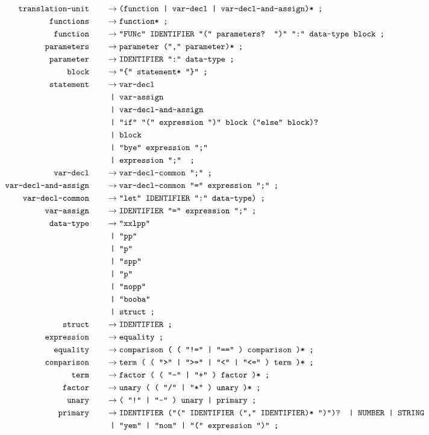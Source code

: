 \documentclass[12pt, a4paper]{article}
\newcommand{\ttt}[1]{
    \text{\texttt{#1}}
}
\newcommand{\ebnfnode}[2]{%
    #1\hspace{20px} &\to #2\ttt{ ;}\\
}
\newcommand{\ebnfnodett}[2]{%
    \ebnfnode{\ttt{#1}}{\ttt{#2}}
}
\begin{document}
    \begin{align*}
        \ebnfnodett{translation-unit}{(function | var-decl | var-decl-and-assign)*}
        \ebnfnodett{functions}{function*}
        \ebnfnodett{function}{"FUNc" IDENTIFIER "(" parameters? ")" ":" data-type block}
        \ebnfnodett{parameters}{parameter ("," parameter)*}
        \ebnfnodett{parameter}{IDENTIFIER ":" data-type}
        \ebnfnodett{block}{"\{" statement* "\}"}
        \ebnfnode{\ttt{statement}}
        {%
            \ttt{var-decl}\\
            &\ttt{ | var-assign }\\
            &\ttt{ | var-decl-and-assign }\\
            &\ttt{ | "if" "(" expression ")" block ("else" block)?}\\
            &\ttt{ | block }\\
            &\ttt{ | "bye" expression ";" }\\
            &\ttt{ | expression ";" }
        }
        \ebnfnodett{var-decl}{var-decl-common ";"}
        \ebnfnodett{var-decl-and-assign}{var-decl-common "=" expression ";"}
        \ebnfnodett{var-decl-common}{"let" IDENTIFIER ":" data-type)}
        \ebnfnodett{var-assign}{IDENTIFIER "=" expression ";"}
        \ebnfnode{\ttt{data-type}}
        {%
            \ttt{"xxlpp"}\\
            &\ttt{ | "pp"}\\
            &\ttt{ | "p"}\\
            &\ttt{ | "spp"}\\
            &\ttt{ | "p"}\\
            &\ttt{ | "nopp"}\\
            &\ttt{ | "booba"}\\
            &\ttt{ | struct}
        }
        \ebnfnodett{struct}{IDENTIFIER}
        \ebnfnodett{expression}{equality}
        \ebnfnodett{equality}{comparison ( ( "!=" | "==" ) comparison )*}
        \ebnfnodett{comparison}{term ( ( ">" | ">=" | "<" | "<=" ) term )*}
        \ebnfnodett{term}{factor ( ( "-" | "+" ) factor )*}
        \ebnfnodett{factor}{unary ( ( "/" | "*" ) unary )*}
        \ebnfnodett{unary}{( "!" | "-" ) unary | primary}
        \ebnfnode{\ttt{primary}}
        {%
            \ttt{IDENTIFIER ("(" IDENTIFIER ("," IDENTIFIER)* ")")? | NUMBER | STRING}\\
            &\ttt{ | "yem" | "nom" | "(" expression ")"}
        }
    \end{align*}
\end{document}
